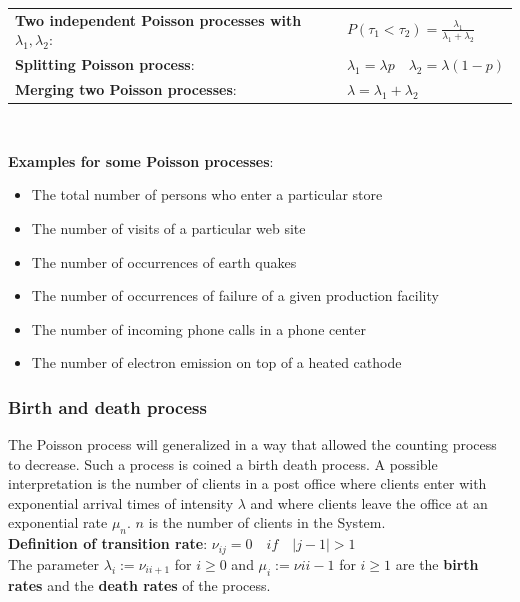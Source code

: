 \renewcommand{\arraystretch}{2}
\begin{tabular}{|l|l|}
	\hline
	\textbf{Two independent Poisson processes with $\lambda_1,\lambda_2$}: & $P(\tau_1 < \tau_2)=\displaystyle\frac{\lambda_1}{\lambda_1+\lambda_2}$ \\
	\textbf{Splitting Poisson process}: & $\lambda_1 = \lambda p \quad \lambda_2 = \lambda (1-p)$\\
	\textbf{Merging two Poisson processes}: & $\lambda = \lambda_1 + \lambda_2$\\
	\hline
\end{tabular}\\
\renewcommand{\arraystretch}{1.0}

\textbf{Examples for some Poisson processes}: 
\begin{itemize}
	\item The total number of persons who enter a particular store
	\item The number of visits of a particular web site
	\item The number of occurrences of earth quakes
	\item The number of occurrences of failure of a given production facility
	\item The number of incoming phone calls in a phone center
	\item The number of electron emission on top of a heated cathode
\end{itemize}

\subsubsection{Birth and death process }

The Poisson process will generalized in a way that allowed the counting process to decrease. Such a process is coined a birth death process. A possible interpretation is the number of clients in a post office where clients enter with exponential arrival times of intensity $\lambda$ and where clients leave the office at an exponential rate $\mu_n$. $n$ is the number of clients in the System.\\

\textbf{Definition of transition rate}: $\nu_{ij}=0 \quad if\quad |j-1|>1$\\

The parameter $\lambda_i:=\nu_{ii+1}$ for $i\geq 0$ and $\mu_i:=\nu{ii-1}$ for $i\geq 1$ are the \textbf{birth rates} and the \textbf{death rates} of the process.


